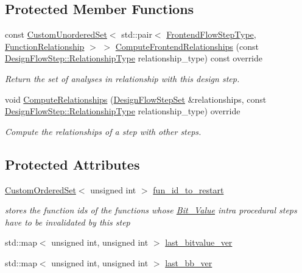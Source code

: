\subsection*{Protected Member Functions}
\begin{DoxyCompactItemize}
\item 
const \hyperlink{classCustomUnorderedSet}{Custom\+Unordered\+Set}$<$ std\+::pair$<$ \hyperlink{frontend__flow__step_8hpp_afeb3716c693d2b2e4ed3e6d04c3b63bb}{Frontend\+Flow\+Step\+Type}, \hyperlink{classFrontendFlowStep_af7cf30f2023e5b99e637dc2058289ab0}{Function\+Relationship} $>$ $>$ \hyperlink{classBitValueIPA_a0e16342c15cf3d4544c1f96e40837e0a}{Compute\+Frontend\+Relationships} (const \hyperlink{classDesignFlowStep_a723a3baf19ff2ceb77bc13e099d0b1b7}{Design\+Flow\+Step\+::\+Relationship\+Type} relationship\+\_\+type) const override
\begin{DoxyCompactList}\small\item\em Return the set of analyses in relationship with this design step. \end{DoxyCompactList}\item 
void \hyperlink{classBitValueIPA_a0599406c42da912fe0c0d768bf52e73a}{Compute\+Relationships} (\hyperlink{classDesignFlowStepSet}{Design\+Flow\+Step\+Set} \&relationships, const \hyperlink{classDesignFlowStep_a723a3baf19ff2ceb77bc13e099d0b1b7}{Design\+Flow\+Step\+::\+Relationship\+Type} relationship\+\_\+type) override
\begin{DoxyCompactList}\small\item\em Compute the relationships of a step with other steps. \end{DoxyCompactList}\end{DoxyCompactItemize}
\subsection*{Protected Attributes}
\begin{DoxyCompactItemize}
\item 
\hyperlink{classCustomOrderedSet}{Custom\+Ordered\+Set}$<$ unsigned int $>$ \hyperlink{classBitValueIPA_a26c174c45034e2f71f54c6f12e60905c}{fun\+\_\+id\+\_\+to\+\_\+restart}
\begin{DoxyCompactList}\small\item\em stores the function ids of the functions whose \hyperlink{classBit__Value}{Bit\+\_\+\+Value} intra procedural steps have to be invalidated by this step \end{DoxyCompactList}\item 
std\+::map$<$ unsigned int, unsigned int $>$ \hyperlink{classBitValueIPA_a516ec9530d59d434020c42ea8a22b4f4}{last\+\_\+bitvalue\+\_\+ver}
\item 
std\+::map$<$ unsigned int, unsigned int $>$ \hyperlink{classBitValueIPA_a021bda2f1b73a5221fd0c4b25f80ef1a}{last\+\_\+bb\+\_\+ver}
\end{DoxyCompactItemize}
